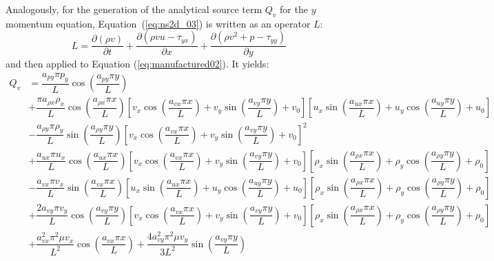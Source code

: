 \documentclass[10pt]{article}
\newcommand{\Diff}[2] {\dfrac{\partial( #1)}{\partial #2}}
\begin{document}
\begin{landscape}
Analogously, for the generation of the analytical source term $Q_v$ for the $y$ momentum equation, Equation~(\ref{eq:ns2d_03}) is written as an  operator $L$:
\begin{equation}
  \label{eq:ns2d_13}
  L = \Diff{\rho v}{t} + \Diff{\rho vu - \tau_{yx}}{x}+\Diff{\rho v^2+p-\tau_{yy}}{y}
\end{equation}
and then applied to Equation  (\ref{eq:manufactured02}). It yields:
\begin{equation}
\begin{split} 
Q_v &=  \dfrac{ a_{py}  \pi   p_y }{L}\cos \left( \dfrac{a_{py} \pi y}{L} \right)  \\
&+ \dfrac{ \pi  a_{\rho x} \rho_x  }{L} \cos \left( \dfrac{ a_{\rho x}\pi x}{L} \right) \left[v_x  \cos \left( \dfrac{a_{vx} \pi x}{L} \right) +v_y  \sin\left( \dfrac{a_{vy} \pi y}{L} \right) +v_ 0\right] \left[u_x  \sin\left( \dfrac{a_{ux} \pi x}{L} \right) +u_y  \cos \left( \dfrac{a_{uy} \pi y}{L} \right) +u_ 0\right]  \\
& -  \dfrac{a_{\rho y}\pi\rho_y   }{L}  \sin\left( \dfrac{a_{\rho y}\pi y }{L} \right) \left[v_x  \cos \left( \dfrac{a_{vx} \pi x}{L} \right) +v_y  \sin\left( \dfrac{a_{vy} \pi y}{L} \right) +v_ 0\right]^2  \\
& + \dfrac{a_{ux} \pi   u_x }{L} \cos \left( \dfrac{a_{ux} \pi x}{L} \right)  \left[v_x  \cos \left( \dfrac{a_{vx} \pi x}{L} \right) +v_y  \sin\left( \dfrac{a_{vy} \pi y}{L} \right) +v_ 0\right]\left[\rho_x \sin\left(\dfrac{a_{\rho x} \pi x}{L}\right) + \rho_y \cos\left(\dfrac{a_{\rho y} \pi y}{L}\right) + \rho_0\right]  \\
& -\dfrac{ a_{vx} \pi v_x }{L} \sin\left( \dfrac{a_{vx} \pi x}{L} \right) \left[u_x  \sin\left( \dfrac{a_{ux} \pi x}{L} \right) +u_y  \cos \left( \dfrac{a_{uy} \pi y}{L} \right) +u_ 0\right]\left[\rho_x \sin\left(\dfrac{a_{\rho x} \pi x}{L}\right) + \rho_y \cos\left(\dfrac{a_{\rho y} \pi y}{L}\right) + \rho_0\right]  \\
& +\dfrac{2  a_{vy} \pi v_y  }{L} \cos \left( \dfrac{a_{vy} \pi y}{L} \right)\left[v_x  \cos \left( \dfrac{a_{vx} \pi x}{L} \right) +v_y  \sin\left( \dfrac{a_{vy} \pi y}{L} \right) +v_ 0\right]\left[\rho_x \sin\left(\dfrac{a_{\rho x} \pi x}{L}\right) + \rho_y \cos\left(\dfrac{a_{\rho y} \pi y}{L}\right) + \rho_0\right]\\
& + \dfrac{a_{vx}^2 \pi^2 \mu   v_x  }{L^2}\cos \left( \dfrac{a_{vx} \pi x}{L} \right)  +  \dfrac{4 a_{vy}^2  \pi^2 \mu  v_y  }{3L^2}\sin\left( \dfrac{a_{vy} \pi y}{L} \right)
 \end{split}
\end{equation}


\end{landscape}
\end{document}
